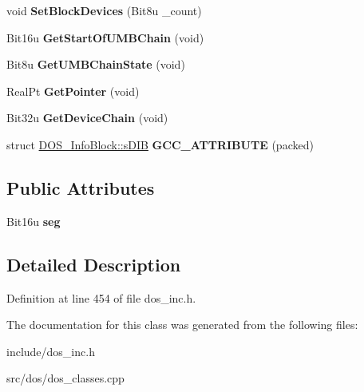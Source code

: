 \begin{DoxyCompactItemize}
\item 
\hypertarget{classDOS__InfoBlock_a1a37f96ed7976f3ef518b065dafabbf9}{void {\bfseries Set\-Block\-Devices} (Bit8u \-\_\-count)}\label{classDOS__InfoBlock_a1a37f96ed7976f3ef518b065dafabbf9}

\item 
\hypertarget{classDOS__InfoBlock_adb819f949bb84a57ec47b3eadcf8394b}{Bit16u {\bfseries Get\-Start\-Of\-U\-M\-B\-Chain} (void)}\label{classDOS__InfoBlock_adb819f949bb84a57ec47b3eadcf8394b}

\item 
\hypertarget{classDOS__InfoBlock_a77f19be942b10a316e54464547cfb2e2}{Bit8u {\bfseries Get\-U\-M\-B\-Chain\-State} (void)}\label{classDOS__InfoBlock_a77f19be942b10a316e54464547cfb2e2}

\item 
\hypertarget{classDOS__InfoBlock_a872b7fd95a7af22e303971abffc41e86}{Real\-Pt {\bfseries Get\-Pointer} (void)}\label{classDOS__InfoBlock_a872b7fd95a7af22e303971abffc41e86}

\item 
\hypertarget{classDOS__InfoBlock_a79370f3f9f5a228c2b584b330b912dcc}{Bit32u {\bfseries Get\-Device\-Chain} (void)}\label{classDOS__InfoBlock_a79370f3f9f5a228c2b584b330b912dcc}

\item 
\hypertarget{classDOS__InfoBlock_a492f63514c4bc0a876008bd5dffbefb4}{struct \hyperlink{structDOS__InfoBlock_1_1sDIB}{D\-O\-S\-\_\-\-Info\-Block\-::s\-D\-I\-B} {\bfseries G\-C\-C\-\_\-\-A\-T\-T\-R\-I\-B\-U\-T\-E} (packed)}\label{classDOS__InfoBlock_a492f63514c4bc0a876008bd5dffbefb4}

\end{DoxyCompactItemize}
\subsection*{Public Attributes}
\begin{DoxyCompactItemize}
\item 
\hypertarget{classDOS__InfoBlock_ae1079089060526859c4394a55d3153ee}{Bit16u {\bfseries seg}}\label{classDOS__InfoBlock_ae1079089060526859c4394a55d3153ee}

\end{DoxyCompactItemize}


\subsection{Detailed Description}


Definition at line 454 of file dos\-\_\-inc.\-h.



The documentation for this class was generated from the following files\-:\begin{DoxyCompactItemize}
\item 
include/dos\-\_\-inc.\-h\item 
src/dos/dos\-\_\-classes.\-cpp\end{DoxyCompactItemize}
